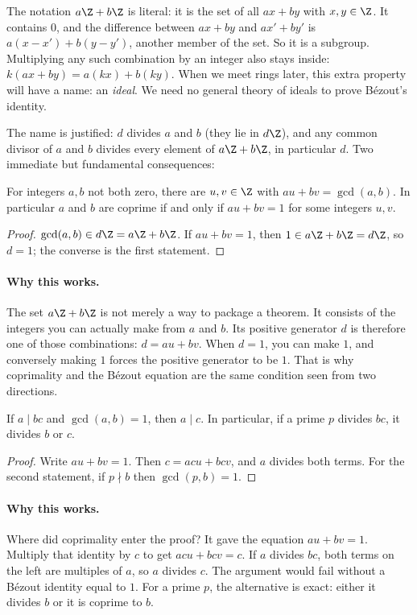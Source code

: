 The notation $a\Z+b\Z$ is literal: it is the set of all $ax+by$ with $x,y\in\Z$. It contains $0$, and the difference between $ax+by$ and $ax'+by'$ is $a(x-x')+b(y-y')$, another member of the set. So it is a subgroup. Multiplying any such combination by an integer also stays inside: $k(ax+by)=a(kx)+b(ky)$. When we meet rings later, this extra property will have a name: an \emph{ideal}. We need no general theory of ideals to prove B\'ezout's identity.

The name is justified: $d$ divides $a$ and $b$ (they lie in $d\Z$), and any common divisor of $a$ and $b$ divides every element of $a\Z+b\Z$, in particular $d$. Two immediate but fundamental consequences:

\begin{theorem}[B\'ezout]\label{thm:bezout}
For integers $a,b$ not both zero, there are $u,v\in\Z$ with $au+bv=\gcd(a,b)$. In particular $a$ and $b$ are coprime if and only if $au+bv=1$ for some integers $u,v$.
\end{theorem}
\begin{proof}
$\gcd(a,b)\in d\Z=a\Z+b\Z$. If $au+bv=1$, then $1\in a\Z+b\Z=d\Z$, so $d=1$; the converse is the first statement.
\end{proof}

\paragraph{Why this works.}
The set $a\Z+b\Z$ is not merely a way to package a theorem. It consists of the integers you can actually make from $a$ and $b$. Its positive generator $d$ is therefore one of those combinations: $d=au+bv$. When $d=1$, you can make $1$, and conversely making $1$ forces the positive generator to be $1$. That is why coprimality and the B\'ezout equation are the same condition seen from two directions.

\begin{theorem}\label{thm:gauss}
If $a\mid bc$ and $\gcd(a,b)=1$, then $a\mid c$. In particular, if a prime $p$ divides $bc$, it divides $b$ or $c$.
\end{theorem}
\begin{proof}
Write $au+bv=1$. Then $c=acu+bcv$, and $a$ divides both terms. For the second statement, if $p\nmid b$ then $\gcd(p,b)=1$.
\end{proof}

\paragraph{Why this works.}
Where did coprimality enter the proof? It gave the equation $au+bv=1$. Multiply that identity by $c$ to get $acu+bcv=c$. If $a$ divides $bc$, both terms on the left are multiples of $a$, so $a$ divides $c$. The argument would fail without a B\'ezout identity equal to $1$. For a prime $p$, the alternative is exact: either it divides $b$ or it is coprime to $b$.

